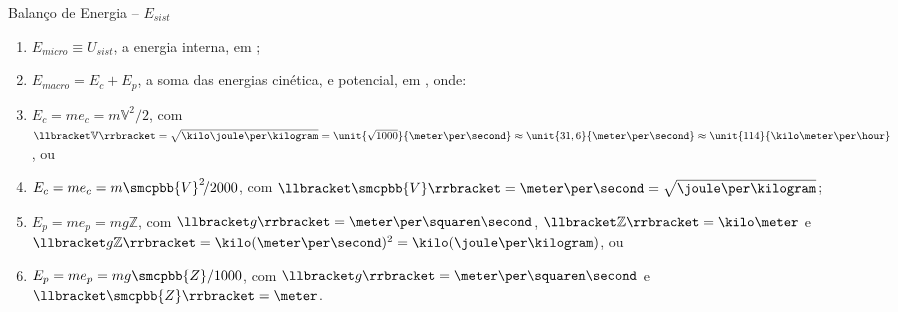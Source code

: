     \begin{frame}{Balanço de Energia -- $E_{sist}$}\vspace*{-2em}
        \\[\medskipamount]
        \begin{enumerate}
            \item<2-> $E_{micro} \equiv U_{sist}$, a \alert{energia interna}, em \kilo\joule;
                \\[\medskipamount]
            \item<3-> $E_{macro} = E_c + E_p$, a soma das energias \alert{cinética}, e
                \alert{potencial}, em \kilo\joule, onde: \\[\medskipamount]
            \item<4-> $E_c = me_c = m\mathbb{V}^2\!/2$, com $\llbracket\mathbb{V}\rrbracket =
                \sqrt{\kilo\joule\per\kilogram} = \unit{\sqrt{1000}}{\meter\per\second} \approx
                \unit{31,6}{\meter\per\second} \approx \unit{114}{\kilo\meter\per\hour}$, ou
                \\[\medskipamount]
            \item<5-> $E_c = me_c = m\smcpbb{V}^2\!/2000$, com $\llbracket\smcpbb{V}\rrbracket =
                \meter\per\second = \sqrt{\joule\per\kilogram}$; \\[\medskipamount]
            \item<6-> $E_p = me_p = mg\mathbb{Z}$, com $\llbracket g\rrbracket =
                \meter\per\squaren\second$, $\llbracket\mathbb{Z}\rrbracket = \kilo\meter$ e
                $\llbracket g\mathbb{Z}\rrbracket = \kilo(\meter\per\second)^2 =
                \kilo(\joule\per\kilogram)$, ou \\[\medskipamount]
            \item<7-> $E_p = me_p = mg\smcpbb{Z}/1000$, com $\llbracket g\rrbracket =
                \meter\per\squaren\second$ e $\llbracket\smcpbb{Z}\rrbracket = \meter$.
        \end{enumerate}
    \end{frame}

